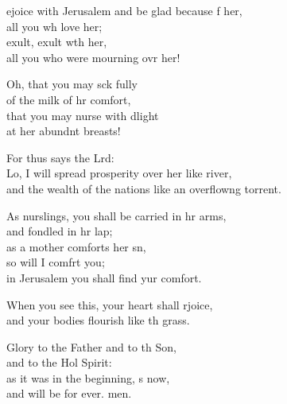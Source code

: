 \begin{psalmverse}
  \begin{patverse}
ejoice with Jerusalem and be glad because f her,\Med\\
all you wh love her;\\
exult, exult w\pointup{\i}th her,\Med\\
all you who were mourning ovr her!

Oh, that you may sck fully\Med\\
of the milk of hr comfort,\\
that you may nurse with dlight\Med\\
at her abundnt breasts!

For thus says the Lrd:\Flex\\
Lo, I will spread prosperity over her like  river,\Med\\
and the wealth of the nations like an overflow\pointup{\i}ng torrent.

As nurslings, you shall be carried in hr arms,\Med\\
and fondled in hr lap;\\
as a mother comforts her sn,\Flex\\
so will I comfrt you;\Med\\
in Jerusalem you shall find yur comfort.

When you see this, your heart shall rjoice,\Med\\
and your bodies flourish like th grass.

Glory to the Father and to th Son,\Med\\
and to the Hol Spirit:\\
as it was in the beginning, \pointup{\i}s now,\Med\\
and will be for ever. men.
  \end{patverse}
\end{psalmverse}
